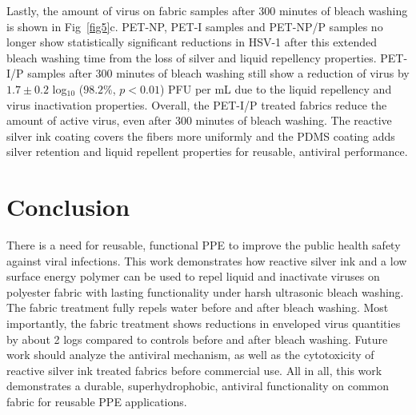 \documentclass[10pt,letterpaper]{article}
\begin{document}

Lastly, the amount of virus on fabric samples after 300 minutes of bleach washing is shown in Fig~\ref{fig5}c. PET-NP, PET-I samples and PET-NP/P samples no longer show statistically significant reductions in HSV-1 after this extended bleach washing time from the loss of silver and liquid repellency properties. PET-I/P samples after 300 minutes of bleach washing still show a reduction of virus by $1.7 \pm 0.2$ log$_{10}$ ($98.2 %
\%$, $p < 0.01$) PFU per mL due to the liquid repellency and virus inactivation properties. %
Overall, the PET-I/P treated fabrics reduce the amount of active virus, even after 300 minutes of bleach washing. The reactive silver ink coating covers the fibers more uniformly and the PDMS coating adds silver retention and liquid repellent properties for reusable, antiviral performance.


\section*{Conclusion}
There is a need for reusable, functional PPE to improve the public health safety against viral infections. This work demonstrates how reactive %
silver ink and a low surface energy polymer can be used to repel liquid and inactivate viruses on polyester fabric with lasting functionality under harsh ultrasonic bleach washing. The fabric treatment fully repels water before and after bleach washing. 
Most importantly, the fabric treatment shows reductions in enveloped virus quantities by about 2 logs compared to controls before and after bleach washing. 
Future work should analyze the antiviral mechanism, as well as the cytotoxicity of reactive silver ink treated fabrics before commercial use. %
All in all, this work demonstrates a durable, superhydrophobic, antiviral functionality on common fabric for reusable PPE applications.
\end{document}
